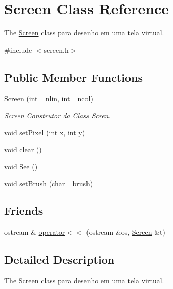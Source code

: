 \hypertarget{class_screen}{}\section{Screen Class Reference}
\label{class_screen}


The \mbox{\hyperlink{class_screen}{Screen}} class para desenho em uma tela virtual.  




{\ttfamily \#include $<$screen.\+h$>$}

\subsection*{Public Member Functions}
\begin{DoxyCompactItemize}
\item 
\mbox{\hyperlink{class_screen_a6c21beca43d25854d8674445127ef2eb}{Screen}} (int \+\_\+nlin, int \+\_\+ncol)
\begin{DoxyCompactList}\small\item\em \mbox{\hyperlink{class_screen}{Screen}} Construtor da Class Scren. \end{DoxyCompactList}\item 
void \mbox{\hyperlink{class_screen_ae6bea81c57a22d226507c3c26fa95ee0}{set\+Pixel}} (int x, int y)
\item 
void \mbox{\hyperlink{class_screen_a35e74266b2a04e37b354ceff7a5f1031}{clear}} ()
\item 
void \mbox{\hyperlink{class_screen_a4ba1818617bcf7a94a79ff8d85b847b8}{See}} ()
\item 
void \mbox{\hyperlink{class_screen_aebc4eb6cb5acf15a0f04c1494622ab23}{set\+Brush}} (char \+\_\+brush)
\end{DoxyCompactItemize}
\subsection*{Friends}
\begin{DoxyCompactItemize}
\item 
ostream \& \mbox{\hyperlink{class_screen_aab6a2880746bfe1b7964817cc8f0989e}{operator$<$$<$}} (ostream \&os, \mbox{\hyperlink{class_screen}{Screen}} \&t)
\end{DoxyCompactItemize}


\subsection{Detailed Description}
The \mbox{\hyperlink{class_screen}{Screen}} class para desenho em uma tela virtual. 

